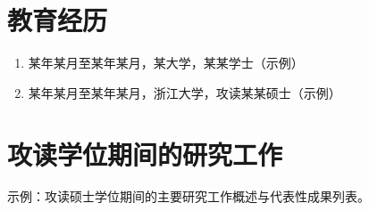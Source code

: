\cleardoublepage
{}


\section*{教育经历}
\begin{enumerate}
    \item 某年某月至某年某月，某大学，某某学士（示例）
    \item 某年某月至某年某月，浙江大学，攻读某某硕士（示例）
\end{enumerate}

\section*{攻读学位期间的研究工作}
示例：攻读硕士学位期间的主要研究工作概述与代表性成果列表。

